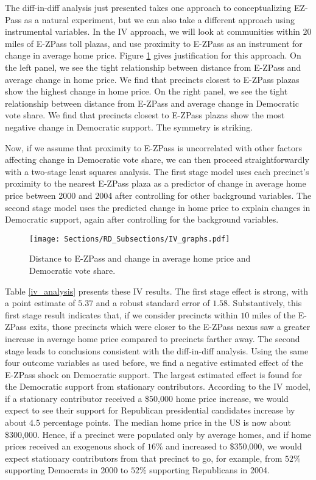 
The diff-in-diff analysis just presented takes one approach to conceptualizing EZ-Pass as a natural experiment, but we can also take a different approach using instrumental variables. In the IV approach, we will look at communities within $20$ miles of E-ZPass toll plazas, and use proximity to E-ZPass as an instrument for change in average home price. Figure \ref{iv_graph} gives justification for this approach. On the left panel, we see the tight relationship between distance from E-ZPass and average change in home price. We find that precincts closest to E-ZPass plazas show the highest change in home price. On the right panel, we see the tight relationship between distance from E-ZPass and average change in Democratic vote share. We find that precincts closest to E-ZPass plazas show the most negative change in Democratic support. The symmetry is striking. 

Now, if we assume that proximity to E-ZPass is uncorrelated with other factors affecting change in Democratic vote share, we can then proceed straightforwardly with a two-stage least squares analysis. The first stage model uses each precinct's proximity to the nearest E-ZPass plaza as a predictor of change in average home price between 2000 and 2004 after controlling for other background variables. The second stage model uses the predicted change in home price to explain changes in Democratic support, again after controlling for the background variables. 

\begin{figure}[htb!]%
    \centering
 \texttt{[image: Sections/RD\_Subsections/IV\_graphs.pdf]}%
   \caption{Distance to E-ZPass and change in average home price and Democratic vote share.}
   \label{iv_graph}
\end{figure}

Table \ref{iv_analysis} presents these IV results. The first stage effect is strong, with a point estimate of $5.37$ and a robust standard error of $1.58$. Substantively, this first stage result indicates that, if we consider precincts within $10$ miles of the E-ZPass exits, those precincts which were closer to the E-ZPass nexus saw a greater increase in average home price compared to precincts farther away. The second stage leads to conclusions consistent with the diff-in-diff analysis. Using the same four outcome variables as used before, we find a negative estimated effect of the E-ZPass shock on Democratic support. The largest estimated effect is found for the Democratic support from stationary contributors. According to the IV model, if a stationary contributor received a \$50,000 home price increase, we would expect to see their support for Republican presidential candidates increase by about $4.5$ percentage points. The median home price in the US is now about \$300,000. Hence, if a precinct were populated only by average homes, and if home prices received an exogenous shock of $16\%$ and increased to \$350,000, we would expect stationary contributors from that precinct to go, for example, from $52\%$ supporting Democrats in 2000 to $52\%$ supporting Republicans in 2004. 

